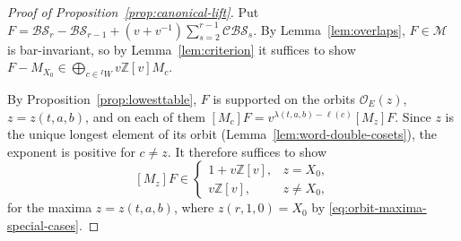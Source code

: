 \documentclass[11pt,a4paper,reqno]{amsart}
\numberwithin{equation}{section}
\theoremstyle{definition}
\theoremstyle{remark}
\theoremstyle{plain}
\newcommand{\M}{\mathcal M}
\newcommand{\R}{\mathcal {BS}}
\newcommand{\V}{\mathcal {CBS}}
\begin{document}
\begin{proof}[Proof of Proposition~\ref{prop:canonical-lift}]
Put $F=\R_r-\R_{r-1}+(v+v^{-1})\sum_{s=2}^{r-1}\V_s$. By Lemma~\ref{lem:overlaps}, $F\in\M$ is bar-invariant, so by
Lemma~\ref{lem:criterion} it suffices to show $F-M_{X_0}\in\bigoplus_{c\in{}^IW}v\mathbb Z[v]M_c$.

By Proposition~\ref{prop:lowesttable}, $F$ is supported on the orbits $\mathcal O_E(z)$, $z=z(t,a,b)$, and on each of them
$[M_c]F=v^{\lambda(t,a,b)-\ell(c)}[M_z]F$. Since $z$ is the unique longest element of its orbit (Lemma~\ref{lem:word-double-cosets}),
the exponent is positive for $c\neq z$. It therefore suffices to show
\begin{equation}\label{eq:canonical-lift-maximal-coefficients}
 [M_z]F\in
 \begin{cases}
  1+v\mathbb Z[v],&z=X_0,\\
  v\mathbb Z[v],&z\neq X_0,
 \end{cases}
\end{equation}
for the maxima $z=z(t,a,b)$, where $z(r,1,0)=X_0$ by \eqref{eq:orbit-maxima-special-cases}.


\end{proof}
\end{document}
